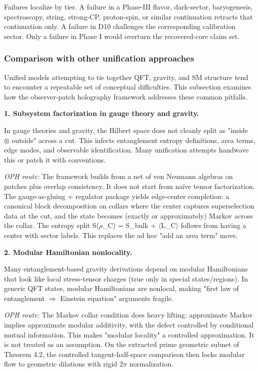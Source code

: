 Failures localize by tier. A failure in a Phase-III flavor, dark-sector, baryogenesis, spectroscopy, string, strong-CP, proton-spin, or similar continuation retracts that continuation only. A failure in D10 challenges the corresponding calibration sector. Only a failure in Phase I would overturn the recovered-core claim set.

\subsubsection{Comparison with other unification approaches}\label{85-comparison-with-other-unification-approaches}

Unified models attempting to tie together QFT, gravity, and SM structure tend to encounter a repeatable set of conceptual difficulties. This subsection examines how the observer-patch holography framework addresses these common pitfalls.

\textbf{1. Subsystem factorization in gauge theory and gravity.}

In gauge theories and gravity, the Hilbert space does not cleanly split as "inside \ensuremath{\otimes} outside" across a cut. This infects entanglement entropy definitions, area terms, edge modes, and observable identification. Many unification attempts handwave this or patch it with conventions.

\emph{OPH route:} The framework builds from a net of von Neumann algebras on patches plus overlap consistency. It does not start from na\"{i}ve tensor factorization. The gauge-as-gluing + regulator package yields edge-center completion: a canonical block decomposition on collars where the center captures superselection data at the cut, and the state becomes (exactly or approximately) Markov across the collar. The entropy split S(\ensuremath{\rho}\_C) = S\_bulk + \ensuremath{\langle}L\_C\ensuremath{\rangle} follows from having a center with sector labels. This replaces the ad hoc "add an area term" move.

\textbf{2. Modular Hamiltonian nonlocality.}

Many entanglement-based gravity derivations depend on modular Hamiltonians that look like local stress-tensor charges (true only in special states/regions). In generic QFT states, modular Hamiltonians are nonlocal, making "first law of entanglement \ensuremath{\Rightarrow} Einstein equation" arguments fragile.

\emph{OPH route:} The Markov collar condition does heavy lifting: approximate Markov implies approximate modular additivity, with the defect controlled by conditional mutual information. This makes "modular locality" a controlled approximation. It is not treated as an assumption. On the extracted prime geometric subnet of Theorem 4.2, the controlled tangent-half-space comparison then locks modular flow to geometric dilations with rigid \(2\pi\) normalization.

